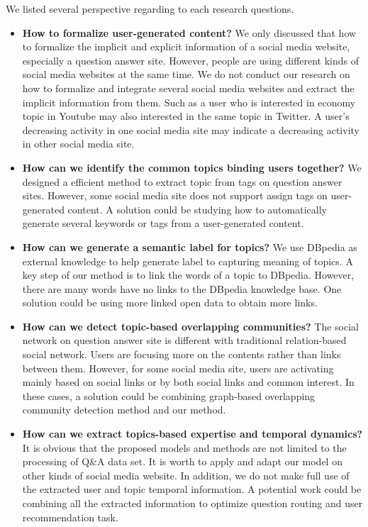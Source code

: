 We listed several perspective regarding to each research questions.
\begin{itemize}
\item{\textbf{How to formalize user-generated content?}
We only discussed that how to formalize the implicit and explicit information of a social media website, especially a question answer site. However, people are using different kinds of social media websites at the same time. We do not conduct our research on how to formalize and integrate several social media websites and extract the implicit information from them. Such as a user who is interested in economy topic in Youtube may also interested in the same topic in Twitter. A user's decreasing activity in one social media site may indicate a decreasing activity in other social media site.}

\item{\textbf{How can we identify the common topics binding users together?} We designed a efficient method to extract topic from tags on question answer sites. However, some social media site does not support assign tags on user-generated content. A solution could be studying how to automatically generate several keywords or tags from a user-generated content.}

\item{\textbf{How can we generate a semantic label for topics?} We use DBpedia as external knowledge to help generate label to capturing meaning of topics. A key step of our method is to link the words of a topic to DBpedia. However, there are many words have no links to the DBpedia knowledge base. One solution could be using more linked open data to obtain more links.}

\item{\textbf{How can we detect topic-based overlapping communities?} The social network on question answer site is different with traditional relation-based social network. Users are focusing more on the contents rather than links between them. However, for some social media site, users are activating mainly based on social links  or by both social links and common interest. In these cases, a solution could be combining graph-based overlapping community detection method and our method.}

\item{\textbf{How can we extract topics-based expertise and temporal dynamics?} It is obvious that the proposed models and methods are not limited to the processing of Q\&A data set. It is worth to apply and adapt our model on other kinds of social media website. In addition, we do not make full use of the extracted user and topic temporal information. A potential work could be combining all the extracted information to optimize question routing and user recommendation task.  }

\end{itemize}


